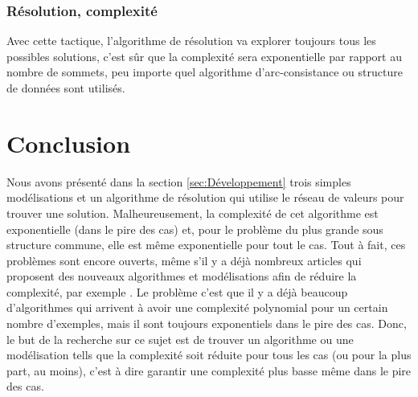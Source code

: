 \documentclass[french]{article}
\theoremstyle{definition}
\theoremstyle{remark}
\begin{document}
\subsubsection{Résolution, complexité}
Avec cette tactique, l'algorithme de résolution va explorer toujours tous les possibles solutions, c'est sûr que la complexité sera exponentielle par rapport au nombre de sommets, peu importe quel algorithme d'arc-consistance ou structure de données sont utilisés. 

\newpage
\section{Conclusion}
\label{sec:conc}
Nous avons présenté dans la section \ref{sec:Développement} trois simples modélisations et un algorithme de résolution qui utilise le réseau de valeurs pour trouver une solution. Malheureusement, la complexité de cet algorithme est exponentielle (dans le pire des cas) et, pour le problème du plus grande sous structure commune, elle est même exponentielle pour tout le cas. Tout à fait, ces problèmes sont encore ouverts, même s'il y a déjà nombreux articles qui proposent des nouveaux algorithmes et modélisations afin de réduire la complexité, par exemple \cite{SorlinS082010,SorlinS08, TakapouiB16}. Le problème c'est que il y a déjà beaucoup d'algorithmes qui arrivent à avoir une complexité polynomial pour un certain nombre d'exemples, mais il sont toujours exponentiels dans le pire des cas. Donc, le but de la recherche sur ce sujet est de trouver un algorithme ou une modélisation tells que la complexité soit réduite pour tous les cas (ou pour la plus part, au moins), c'est à dire garantir une complexité plus basse même dans le pire des cas.



\newpage


\end{document}
